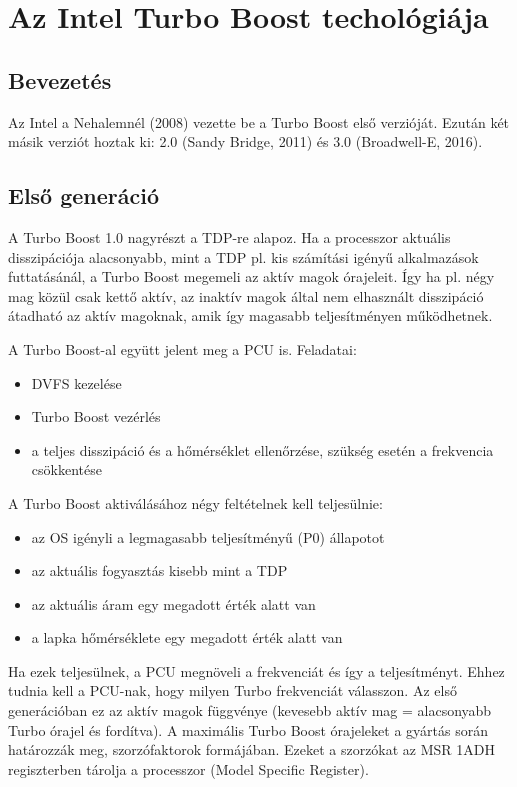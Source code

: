 \section{Az Intel Turbo Boost techológiája}

\subsection{Bevezetés}
Az Intel a Nehalemnél (2008) vezette be a Turbo Boost első verzióját.
Ezután két másik verziót hoztak ki: 2.0 (Sandy Bridge, 2011) és 3.0 (Broadwell-E, 2016).

\subsection{Első generáció}
A Turbo Boost 1.0 nagyrészt a TDP-re alapoz.
Ha a processzor aktuális disszipációja alacsonyabb, mint a TDP pl. kis számítási igényű alkalmazások futtatásánál, a Turbo Boost megemeli az aktív magok órajeleit.
Így ha pl. négy mag közül csak kettő aktív, az inaktív magok által nem elhasznált disszipáció átadható az aktív magoknak, amik így magasabb teljesítményen működhetnek.

A Turbo Boost-al együtt jelent meg a PCU is. Feladatai:
\begin{itemize}
    \item DVFS kezelése
    \item Turbo Boost vezérlés
    \item a teljes disszipáció és a hőmérséklet ellenőrzése, szükség esetén a frekvencia csökkentése
\end{itemize}

A Turbo Boost aktiválásához négy feltételnek kell teljesülnie:
\begin{itemize}
    \item az OS igényli a legmagasabb teljesítményű (P0) állapotot
    \item az aktuális fogyasztás kisebb mint a TDP
    \item az aktuális áram egy megadott érték alatt van
    \item a lapka hőmérséklete egy megadott érték alatt van
\end{itemize}
Ha ezek teljesülnek, a PCU megnöveli a frekvenciát és így a teljesítményt.
Ehhez tudnia kell a PCU-nak, hogy milyen Turbo frekvenciát válasszon.
Az első generációban ez az aktív magok függvénye (kevesebb aktív mag = alacsonyabb Turbo órajel és fordítva).
A maximális Turbo Boost órajeleket a gyártás során határozzák meg, szorzófaktorok formájában.
Ezeket a szorzókat az MSR 1ADH regiszterben tárolja a processzor (Model Specific Register).